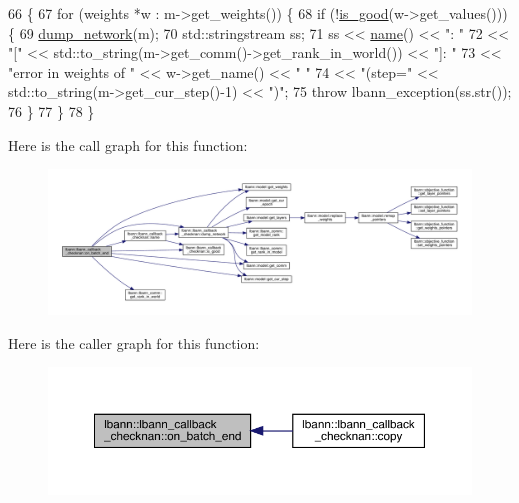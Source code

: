 \begin{DoxyCode}
66                                                    \{
67   \textcolor{keywordflow}{for} (weights *w : m->get\_weights()) \{
68     \textcolor{keywordflow}{if} (!\hyperlink{classlbann_1_1lbann__callback__checknan_ac74f7f665823d0500875b9740aaccabc}{is\_good}(w->get\_values())) \{
69       \hyperlink{classlbann_1_1lbann__callback__checknan_a335713a3df9194f657f98cccd2f695f5}{dump\_network}(m);
70       std::stringstream ss;
71       ss << \hyperlink{classlbann_1_1lbann__callback__checknan_ab42c997a06058c3535792408fdd5fed8}{name}() << \textcolor{stringliteral}{": "}
72          << \textcolor{stringliteral}{"["} << std::to\_string(m->get\_comm()->get\_rank\_in\_world()) << \textcolor{stringliteral}{"]: "}
73          << \textcolor{stringliteral}{"error in weights of "} << w->get\_name() << \textcolor{stringliteral}{" "}
74          << \textcolor{stringliteral}{"(step="} << std::to\_string(m->get\_cur\_step()-1) << \textcolor{stringliteral}{")"};
75       \textcolor{keywordflow}{throw} lbann\_exception(ss.str());
76     \}
77   \}
78 \}
\end{DoxyCode}
Here is the call graph for this function\+:\nopagebreak
\begin{figure}[H]
\begin{center}
\leavevmode
\includegraphics[width=350pt]{classlbann_1_1lbann__callback__checknan_a1d1b3b082aa49016e7b80e0f267575da_cgraph}
\end{center}
\end{figure}
Here is the caller graph for this function\+:\nopagebreak
\begin{figure}[H]
\begin{center}
\leavevmode
\includegraphics[width=350pt]{classlbann_1_1lbann__callback__checknan_a1d1b3b082aa49016e7b80e0f267575da_icgraph}
\end{center}
\end{figure}
\mbox{\label{classlbann_1_1lbann__callback__checknan_a09388ae76566a6a93c957ab76cd54dcd}} 
